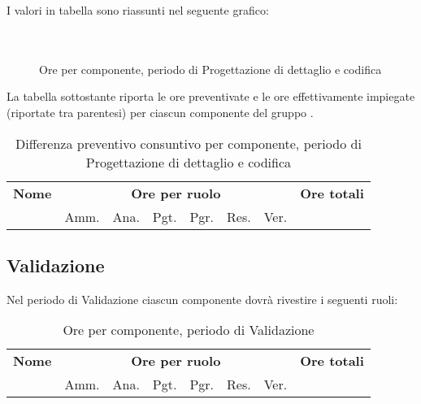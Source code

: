 I valori in tabella sono riassunti nel seguente grafico: \\ \\ \\

\begin{figure}[H]
\caption{Ore per componente, periodo di Progettazione di dettaglio e codifica}
\end{figure}

La tabella sottostante riporta le ore preventivate e le ore effettivamente impiegate (riportate tra parentesi) per ciascun componente del gruppo \GroupName{}.

\begin{center}
\begin{table}[H]
\begin{tabular}{lccccccc}
\toprule
    \textbf{Nome}  & \multicolumn{6}{c}{\textbf{Ore per ruolo}} & \textbf{Ore totali} \\
     & Amm. & Ana. & Pgt. & Pgr. & Res. & Ver. & \\
    \midrule
    
    	
    
    \bottomrule
\end{tabular}
\caption{Differenza preventivo consuntivo per componente, periodo di Progettazione di dettaglio e codifica}
\end{table}
\end{center}

\pagebreak
\subsection{Validazione}

Nel periodo di Validazione ciascun componente dovrà rivestire i seguenti ruoli:

\begin{table}[H]
\centering
\begin{tabular}{lccccccc}
\toprule 
    \textbf{Nome}  & \multicolumn{6}{c}{\textbf{Ore per ruolo}} & \textbf{Ore totali}\\
    & Amm. & Ana. & Pgt. & Pgr. & Res. & Ver. \\
    \midrule

        

    \bottomrule
\end{tabular}
\caption{Ore per componente, periodo di Validazione}
\end{table}

